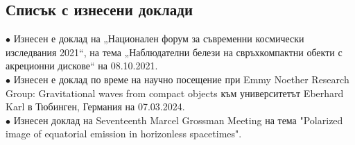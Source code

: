 \documentclass[12pt]{article}
\numberwithin{equation}{section}
\numberwithin{figure}{section}
\begin{document}
	\subsection{Списък с изнесени доклади}

	$\bullet$ Изнесен е доклад на „Национален форум за
	съвременни космически изследвания 2021“, на тема „Наблюдателни
	белези на свръхкомпактни обекти с акреционни дискове“ на 08.10.2021.\\
	
	\noindent$\bullet$ Изнесен е доклад по време на научно посещение при Emmy Noether Research Group: Gravitational waves from compact objects към  университетът Eberhard Karl в Тюбинген, Германия на 07.03.2024.\\
	
	\noindent$\bullet$ Изнесен доклад на Seventeenth Marcel Grossman Meeting на тема "Polarized image of equatorial emission in horizonless spacetimes".
	
	\newpage
	
	
	
\end{document}
